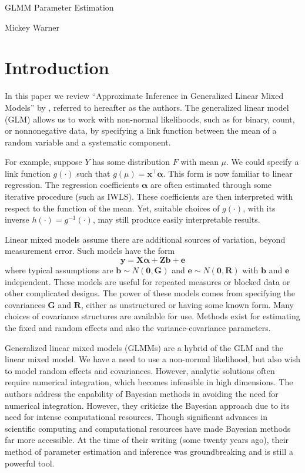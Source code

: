 \documentclass[12pt]{article}
\newcommand{\m}[1]{\mathbf{\bm{#1}}}
\begin{document}
\begin{Large}
\begin{center}
GLMM Parameter Estimation
\bigskip

Mickey Warner
\end{center}
\end{Large}

\section*{Introduction}

\noindent In this paper we review ``Approximate Inference in Generalized Linear Mixed Models'' by \cite{breslow:1993}, referred to hereafter as the authors. The generalized linear model (GLM) \citep{mccullagh:1989} allows us to work with non-normal likelihoods, such as for binary, count, or nonnonegative data, by specifying a link function between the mean of a random variable and a systematic component.

For example, suppose $Y$ has some distribution $F$ with mean $\mu$. We could specify a link function $g(\cdot)$ such that $g(\mu)=\m{x}^\top\m{\alpha}$. This form is now familiar to linear regression. The regression coefficients $\m{\alpha}$ are often estimated through some iterative procedure (such as IWLS). These coefficients are then interpreted with respect to the function of the mean. Yet, suitable choices of $g(\cdot)$, with its inverse $h(\cdot)=g^{-1}(\cdot)$, may still produce easily interpretable results.

Linear mixed models \citep{henderson:1959} assume there are additional sources of variation, beyond measurement error. Such models have the form
\[ \m{y} = \m{X}\m{\alpha} + \m{Z}\m{b} + \m{e} \]
where typical assumptions are $\m{b}\sim N(\m{0}, \m{G})$ and $\m{e}\sim N(\m{0}, \m{R})$ with $\m{b}$ and $\m{e}$ independent. These models are useful for repeated measures or blocked data or other complicated designs. The power of these models comes from specifying the covariances $\m{G}$ and $\m{R}$, either as unstructured or having some known form. Many choices of covariance structures are available for use. Methods exist for estimating the fixed and random effects and also the variance-covariance parameters.

Generalized linear mixed models (GLMMs) are a hybrid of the GLM and the linear mixed model. We have a need to use a non-normal likelihood, but also wish to model random effects and covariances. However, analytic solutions often require numerical integration, which becomes infeasible in high dimensions. The authors address the capability of Bayesian methods in avoiding the need for numerical integration. However, they criticize the Bayesian approach due to its need for intense computational resources. Though significant advances in scientific computing and computational resources have made Bayesian methods far more accessible. At the time of their writing (some twenty years ago), their method of parameter estimation and inference was groundbreaking and is still a powerful tool.
\end{document}
